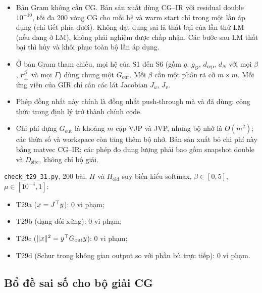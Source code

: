 \begin{hequa}
\begin{itemize}
\item Bản Gram không cần CG. Bản sản xuất dùng CG--IR với residual double $10^{-10}$, tối đa 200 vòng CG cho mỗi hệ và warm start chỉ trong một lần áp dụng (chi tiết phía dưới). Không đạt dung sai là thất bại của lần thử LM (nếu đang ở LM), không phải nghiệm được chấp nhận. Các bước sau LM thất bại thì hủy và khôi phục toàn bộ lần áp dụng.
\item Ở bản Gram tham chiếu, mọi hệ của S1 đến S6 (gồm $g$, $g_O$, $d_{\mathrm{rep}}$, $d_N$ với mọi $\beta$, $r_{\perp}^\beta$ và mọi $\Gamma$) dùng chung một $G_{\mathrm{out}}$. Mỗi $\beta$ cần một phân rã cỡ $m\times m$. Mỗi ứng viên của GIR chỉ cần các lát Jacobian $J_u$, $J_v$.
\item Phép đồng nhất này chính là đồng nhất push-through mà  và  đã dùng: công thức trong định lý trở thành chính code.
\item Chi phí dựng $G_{\mathrm{out}}$ là khoảng $m$ cặp VJP và JVP, nhưng bộ nhớ là $O(m^2)$; các thừa số và workspace còn tăng thêm bộ nhớ. Bản sản xuất bỏ chi phí này bằng matvec CG--IR; các phép đo dung lượng phải bao gồm snapshot double và $D_{\mathrm{site}}$, không chỉ bộ giải.
\end{itemize}
\end{hequa}
\begin{kiem}
\texttt{check\_t29\_31.py}, 200 bài, $H$ và $H_{\mathrm{old}}$ suy biến kiểu softmax, $\beta\in[0,5]$, $\mu\in[10^{-4},1]$:
\begin{itemize}
\item T29a ($x=J^{\top} y$): 0 vi phạm;
\item T29b (dạng đối xứng): 0 vi phạm;
\item T29c ($\lVert x\rVert^2=y^{\top} G_{\mathrm{out}}y$): 0 vi phạm;
\item T29d (Schur trong không gian output so với phần bù trực tiếp): 0 vi phạm.
\end{itemize}
\end{kiem}


\subsection{Bổ đề sai số cho bộ giải CG}

